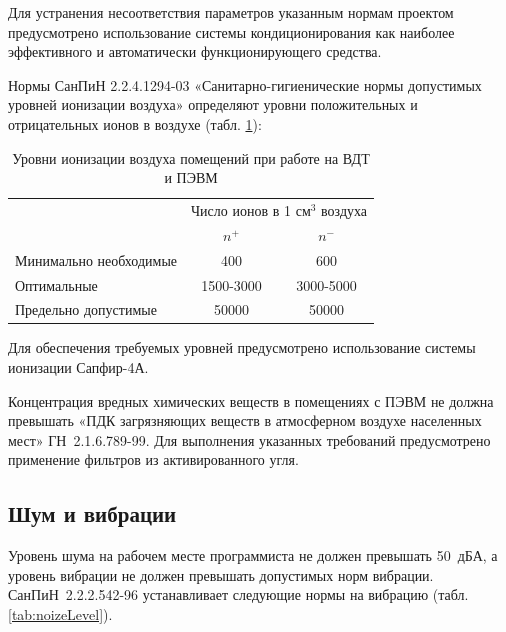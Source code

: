 Для устранения несоответствия параметров указанным нормам проектом предусмотрено использование системы кондиционирования как наиболее эффективного и автоматически функционирующего средства. 

Нормы СанПиН 2.2.4.1294-03 «Санитарно-гигиенические нормы допустимых уровней ионизации воздуха» определяют уровни положительных и отрицательных ионов в воздухе (табл. \ref{tab:ionLevelInAir}):

\begin{table}[ht]
  \center
  \caption{Уровни ионизации воздуха помещений при работе на ВДТ и ПЭВМ}
  \begin{tabular}{|l|c|c|}
  \hline
  \multicolumn{1}{|p{0.4\textwidth}|}{\centering \multirow{2}{*}{Уровни}}
  & \multicolumn{2}{|p{0.4\textwidth}|}{\centering Число ионов в 1 $\text{см}^3$ воздуха} \\
  \cline{2-3} & \multicolumn{1}{|p{0.2\textwidth}|}{\centering $n^{+}$} & \multicolumn{1}{|p{0.2\textwidth}|}{\centering $n^{-}$} \\  
  \hline
  Минимально необходимые &  400 &  600 \\
  \hline
  Оптимальные		     &	1500-3000 & 3000-5000 \\
  \hline
  Предельно допустимые   & 50000 & 50000 \\
  \hline
  \end{tabular}
  \label{tab:ionLevelInAir}
\end{table}

Для обеспечения требуемых уровней предусмотрено использование системы ионизации Сапфир-4А.

Концентрация вредных химических веществ в помещениях с ПЭВМ не должна превышать «ПДК загрязняющих веществ в атмосферном воздухе населенных мест» ГН~2.1.6.789-99. Для выполнения указанных требований предусмотрено применение фильтров из активированного угля.


\subsection{Шум и вибрации}
Уровень шума на рабочем месте программиста не должен превышать 50~дБА, а уровень вибрации не должен превышать допустимых норм вибрации. СанПиН~2.2.2.542-96 устанавливает следующие нормы на вибрацию (табл. \ref{tab:noizeLevel}).

